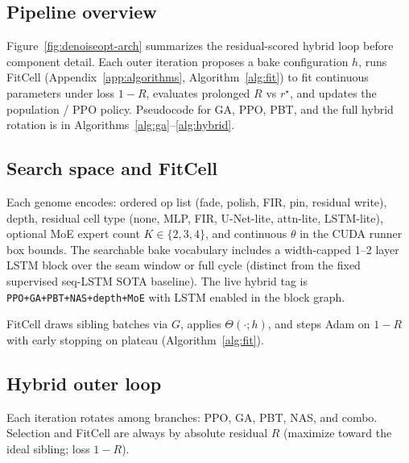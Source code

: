 \subsection{Pipeline overview}
\label{sec:pipeline-overview}

Figure~\ref{fig:denoiseopt-arch} summarizes the residual-scored hybrid loop before component detail.
Each outer iteration proposes a bake configuration $h$, runs FitCell (Appendix~\ref{app:algorithms}, Algorithm~\ref{alg:fit}) to fit continuous parameters under loss $1-R$, evaluates prolonged $R$ vs $r^{\star}$, and updates the population / PPO policy.
Pseudocode for GA, PPO, PBT, and the full hybrid rotation is in Algorithms~\ref{alg:ga}--\ref{alg:hybrid}.



\subsection{Search space and FitCell}
\label{sec:search-space}

Each genome encodes: ordered op list (fade, polish, FIR, pin, residual write), depth, residual cell type (none, MLP, FIR, U-Net-lite, attn-lite, LSTM-lite), optional MoE expert count $K\in\{2,3,4\}$, and continuous $\theta$ in the CUDA runner box bounds.
The searchable bake vocabulary includes a width-capped 1--2 layer LSTM block over the seam window or full cycle (distinct from the fixed supervised seq-LSTM SOTA baseline).
The live hybrid tag is \texttt{PPO+GA+PBT+NAS+depth+MoE} with LSTM enabled in the block graph.

FitCell draws sibling batches via $G$, applies $\Theta(\cdot;h)$, and steps Adam on $1-R$ with early stopping on plateau (Algorithm~\ref{alg:fit}).

\subsection{Hybrid outer loop}
\label{sec:hybrid}

Each iteration rotates among branches: PPO, GA, PBT, NAS, and combo.
Selection and FitCell are always by absolute residual $R$ (maximize toward the ideal sibling; loss $1-R$).

